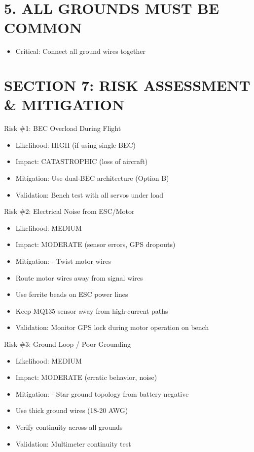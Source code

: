 \documentclass[11pt,letterpaper]{article}
\begin{document}
\section{5. ALL GROUNDS MUST BE COMMON}

\begin{itemize}
  \item Critical: Connect all ground wires together
\end{itemize}

\section{SECTION 7: RISK ASSESSMENT \& MITIGATION}

Risk \#1: BEC Overload During Flight\par

\begin{itemize}
  \item Likelihood:   HIGH (if using single BEC)
  \item Impact:       CATASTROPHIC (loss of aircraft)
  \item Mitigation:   Use dual-BEC architecture (Option B)
  \item Validation:   Bench test with all servos under load
\end{itemize}

Risk \#2: Electrical Noise from ESC/Motor\par

\begin{itemize}
  \item Likelihood:   MEDIUM
  \item Impact:       MODERATE (sensor errors, GPS dropouts)
  \item Mitigation:   - Twist motor wires
  \item Route motor wires away from signal wires
  \item Use ferrite beads on ESC power lines
  \item Keep MQ135 sensor away from high-current paths
  \item Validation:   Monitor GPS lock during motor operation on bench
\end{itemize}

Risk \#3: Ground Loop / Poor Grounding\par

\begin{itemize}
  \item Likelihood:   MEDIUM
  \item Impact:       MODERATE (erratic behavior, noise)
  \item Mitigation:   - Star ground topology from battery negative
  \item Use thick ground wires (18-20 AWG)
  \item Verify continuity across all grounds
  \item Validation:   Multimeter continuity test
\end{itemize}
\end{document}
